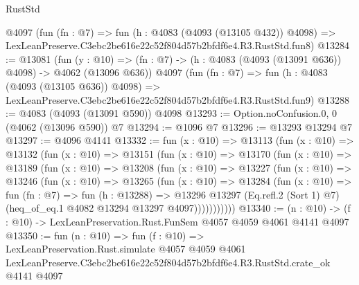 \begin{lexlean}{RustStd}
\begin{coremodule}
    @4097
    (fun (fn : @7) =>
    fun (h : @4083 (@4093 (@13105 @432)) @4098) =>
    LexLeanPreserve.C3ebc2be616e22c52f804d57b2bfdf6e4.R3.RustStd.fun8)
@13284 := @13081
    (fun (y : @10) => (fn : @7) -> (h : @4083 (@4093 (@13091 @636)) @4098) -> @4062 (@13096 @636))
    @4097
    (fun (fn : @7) =>
    fun (h : @4083 (@4093 (@13105 @636)) @4098) =>
    LexLeanPreserve.C3ebc2be616e22c52f804d57b2bfdf6e4.R3.RustStd.fun9)
@13288 := @4083 (@4093 (@13091 @590)) @4098
@13293 := Option.noConfusion.{0, 0} (@4062 (@13096 @590)) @7
@13294 := @1096 @7
@13296 := @13293 @13294 @7
@13297 := @4096 @4141
@13332 := fun (x : @10) =>
  @13113
    (fun (x : @10) =>
    @13132
      (fun (x : @10) =>
      @13151
        (fun (x : @10) =>
        @13170
          (fun (x : @10) =>
          @13189
            (fun (x : @10) =>
            @13208
              (fun (x : @10) =>
              @13227
                (fun (x : @10) =>
                @13246
                  (fun (x : @10) =>
                  @13265
                    (fun (x : @10) =>
                    @13284
                      (fun (x : @10) =>
                      fun (fn : @7) =>
                      fun (h : @13288) =>
                      @13296
                        @13297
                        (Eq.refl.{2} (Sort 1) @7)
                        (heq_of_eq.{1} @4082 @13294 @13297 @4097)))))))))))
@13340 := (n : @10) -> (f : @10) -> LexLeanPreservation.Rust.FunSem @4057 @4059 @4061 @4141 @4097
@13350 := fun (n : @10) =>
  fun (f : @10) =>
  LexLeanPreservation.Rust.simulate
    @4057
    @4059
    @4061
    LexLeanPreserve.C3ebc2be616e22c52f804d57b2bfdf6e4.R3.RustStd.crate_ok
    @4141
    @4097
\end{coremodule}
\end{lexlean}
